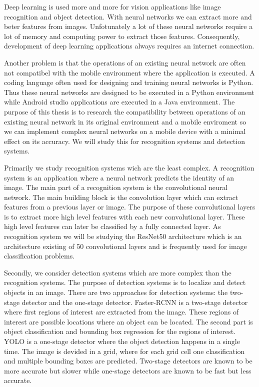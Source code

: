 Deep learning is used more and more for vision applications like image recognition and object detection. 
With neural networks we can extract more and beter features from images.
Unfotunately a lot of these neural networks require a lot of memory and computing power to extract those features.
Consequently, development of deep learning applications always requires an internet connection.

Another problem is that the operations of an existing neural network are often not compatibel with the mobile environment where the application is executed.
A coding language often used for designing and training neural networks is Python.
Thus these neural networks are designed to be executed in a Python environment while Android studio applications are executed in a Java environment.
The purpose of this thesis is to research the compatibility between operations of an existing neural network in its original environment and a mobile enviroment so we can implement complex neural networks on a mobile device with a minimal effect on its accuracy.
We will study this for recognition systems and detection systems.

Primarily we study recognition systems wich are the least complex.
A recognition system is an application where a neural network predicts the identity of an image.
The main part of a recognition system is the convolutional neural network.
The main building block is the convolution layer which can extract features from a previous layer or image.
The purpose of these convolutional layers is to extract more high level features with each new convolutional layer.
These high level features can later be classified by a fully connected layer.
As recognition system we will be studying the ResNet50 architecture which is an architecture existing of 50 convolutional layers and is frequently used for image classification problems.

Secondly, we consider detection systems which are more complex than the recognition systems.
The purpose of detection systems is to localize and detect objects in an image.
There are two approaches for detection systems: the two-stage detector and the one-stage detector.
Faster-RCNN is a two-stage detector where first regions of interest are extracted from the image.
These regions of interest are possible locations where an object can be located.
The second part is object classification and bounding box regression for the regions of interest.
YOLO is a one-stage detector where the object detection happens in a single time.
The image is devided in a grid, where for each grid cell one classification and multiple bounding boxes are predicted.
Two-stage detectors are known to be more accurate but slower while one-stage detectors are known to be fast but less accurate.

